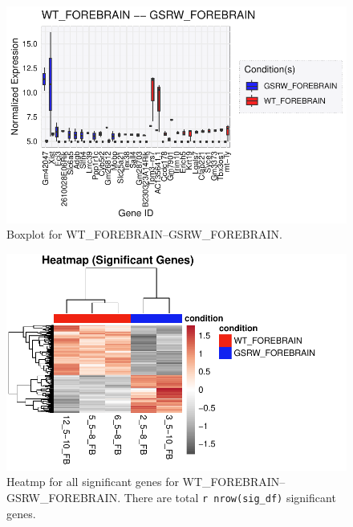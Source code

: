 \documentclass[
  letterpaper,
  DIV=11,
  numbers=noendperiod]{scrartcl}
\newenvironment{Shaded}{\begin{snugshade}}{\end{snugshade}}
\newcommand{\FunctionTok}[1]{\textcolor[rgb]{0.28,0.35,0.67}{#1}}
\newcommand{\NormalTok}[1]{\textcolor[rgb]{0.00,0.23,0.31}{#1}}
\newcommand{\SpecialCharTok}[1]{\textcolor[rgb]{0.37,0.37,0.37}{#1}}
\begin{document}
\begin{figure}[H]

{\centering \includegraphics{sample_report_trial_files/figure-pdf/fig-boxplot_single_1-1.pdf}

}

\caption{\label{fig-boxplot_single_1}Boxplot for
WT\_FOREBRAIN--GSRW\_FOREBRAIN.}

\end{figure}

\begin{Shaded}
\end{Shaded}

\begin{figure}[H]

{\centering \includegraphics{sample_report_trial_files/figure-pdf/fig-hm_1-1.pdf}

}

\caption{\label{fig-hm_1}Heatmp for all significant genes for
WT\_FOREBRAIN--GSRW\_FOREBRAIN. There are total
\texttt{r\ nrow(sig\_df)} significant genes.}

\end{figure}
\end{document}
